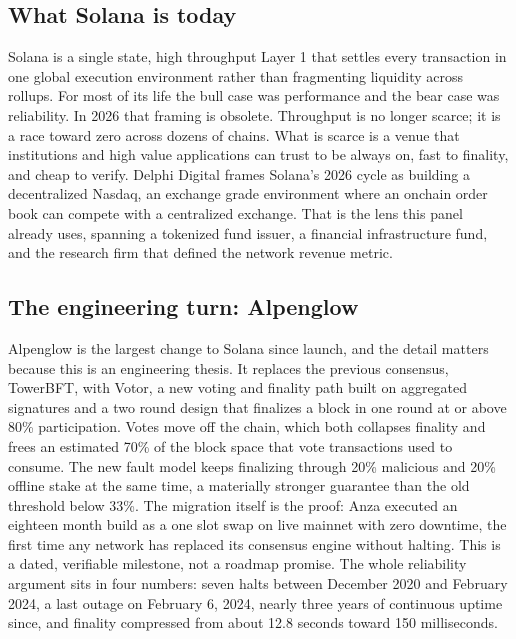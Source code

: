 \documentclass[11pt]{article}
\begin{document}
\subsection{What Solana is today}
Solana is a single state, high throughput Layer 1 that settles every transaction in one global execution environment rather than fragmenting liquidity across rollups. For most of its life the bull case was performance and the bear case was reliability. In 2026 that framing is obsolete. Throughput is no longer scarce; it is a race toward zero across dozens of chains. What is scarce is a venue that institutions and high value applications can trust to be always on, fast to finality, and cheap to verify. Delphi Digital frames Solana's 2026 cycle as building a decentralized Nasdaq, an exchange grade environment where an onchain order book can compete with a centralized exchange. That is the lens this panel already uses, spanning a tokenized fund issuer, a financial infrastructure fund, and the research firm that defined the network revenue metric.

\subsection{The engineering turn: Alpenglow}
Alpenglow is the largest change to Solana since launch, and the detail matters because this is an engineering thesis. It replaces the previous consensus, TowerBFT, with Votor, a new voting and finality path built on aggregated signatures and a two round design that finalizes a block in one round at or above 80\% participation. Votes move off the chain, which both collapses finality and frees an estimated 70\% of the block space that vote transactions used to consume. The new fault model keeps finalizing through 20\% malicious and 20\% offline stake at the same time, a materially stronger guarantee than the old threshold below 33\%. The migration itself is the proof: Anza executed an eighteen month build as a one slot swap on live mainnet with zero downtime, the first time any network has replaced its consensus engine without halting. This is a dated, verifiable milestone, not a roadmap promise. The whole reliability argument sits in four numbers: seven halts between December 2020 and February 2024, a last outage on February 6, 2024, nearly three years of continuous uptime since, and finality compressed from about 12.8 seconds toward 150 milliseconds.
\end{document}
